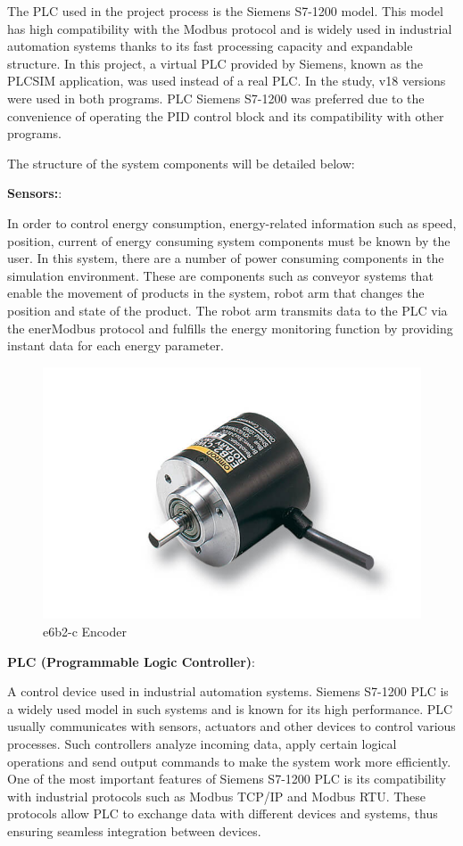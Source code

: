 The PLC used in the project process is the Siemens S7-1200 model. This model has high compatibility with the Modbus protocol and is widely used in industrial automation systems thanks to its fast processing capacity and expandable structure. In this project, a virtual PLC provided by Siemens, known as the PLCSIM application, was used instead of a real PLC. In the study, v18 versions were used in both programs. PLC Siemens S7-1200 was preferred due to the convenience of operating the PID control block and its compatibility with other programs.

The structure of the system components will be detailed below:

\textbf{Sensors:}: 

In order to control energy consumption, energy-related information such as speed, position, current of energy consuming system components must be known by the user. In this system, there are a number of power consuming components in the simulation environment. These are components such as conveyor systems that enable the movement of products in the system, robot arm that changes the position and state of the product. The robot arm transmits data to the PLC via the enerModbus protocol and fulfills the energy monitoring function by providing instant data for each energy parameter. 

\begin{figure}[H]
    \centering
    \includegraphics[width=0.8\columnwidth]{encoder.jpg}
    \caption[e6b2-c Encoder]{e6b2-c Encoder}
    \label{fig-magnitude}
\end{figure}%

\textbf{PLC (Programmable Logic Controller)}: 

A control device used in industrial automation systems. Siemens S7-1200 PLC is a widely used model in such systems and is known for its high performance. PLC usually communicates with sensors, actuators and other devices to control various processes. Such controllers analyze incoming data, apply certain logical operations and send output commands to make the system work more efficiently. One of the most important features of Siemens S7-1200 PLC is its compatibility with industrial protocols such as Modbus TCP/IP and Modbus RTU. These protocols allow PLC to exchange data with different devices and systems, thus ensuring seamless integration between devices.

